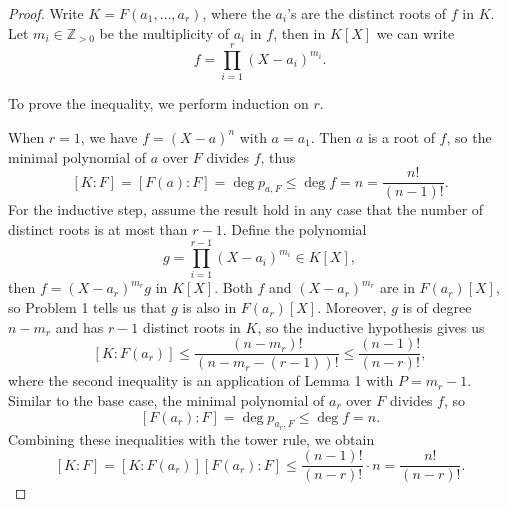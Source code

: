 \documentclass[12pt]{article}
\theoremstyle{definition}
\newcommand{\Z}{\mathbb{Z}}
\newcommand{\<}{\langle}
\renewcommand{\>}{\rangle}
\begin{document}
\begin{proof}
    Write $K = F(a_1, \dots, a_r)$, where the $a_i$'s are the distinct roots of $f$ in $K$.
    Let $m_i \in \Z_{>0}$ be the multiplicity of $a_i$ in $f$, then in $K[X]$ we can write
    \[
        f = \prod_{i=1}^{r} (X - a_i)^{m_i}.
    \]

    To prove the inequality, we perform induction on $r$.

    When $r = 1$, we have $f = (X - a)^{n}$ with $a = a_1$.
    Then $a$ is a root of $f$, so the minimal polynomial of $a$ over $F$ divides $f$, thus
    \[
        [K : F]
            = [F(a) : F]
            = \deg p_{a, F}
            \leq \deg f
            = n
            = \frac{n!}{(n - 1)!}.
    \]
    For the inductive step, assume the result hold in any case that the number of distinct roots is at most than $r - 1$.
    Define the polynomial
    \[
        g = \prod_{i=1}^{r-1} (X - a_i)^{m_i} \in K[X],
    \]
    then $f = (X - a_r)^{m_r} g$ in $K[X]$.
    Both $f$ and $(X - a_r)^{m_r}$ are in $F(a_r)[X]$, so Problem 1 tells us that $g$ is also in $F(a_r)[X]$.
    Moreover, $g$ is of degree $n - m_r$ and has $r - 1$ distinct roots in $K$, so the inductive hypothesis gives us
    \[
        [K : F(a_r)]
            \leq \frac{(n - m_r)!}{(n - m_r - (r - 1))!}
            \leq \frac{(n - 1)!}{(n - r)!},
    \]
    where the second inequality is an application of Lemma 1 with $P = m_r - 1$.
    Similar to the base case, the minimal polynomial of $a_r$ over $F$ divides $f$, so
    \[
        [F(a_r) : F] = \deg p_{a_r, F} \leq \deg f = n.
    \]
    Combining these inequalities with the tower rule, we obtain
    \[
        [K : F]
            = [K : F(a_r)][F(a_r) : F]
            \leq \frac{(n - 1)!}{(n - r)!} \cdot n
            = \frac{n!}{(n - r)!}.
    \]
\end{proof}
\end{document}
